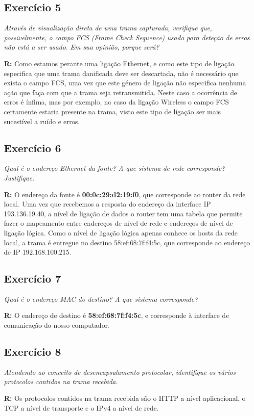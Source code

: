 \documentclass{llncs}
\begin{document}
\subsection{Exercício 5}
\emph{Através de visualização direta de uma trama capturada, verifique que, possivelmente,
o campo FCS (Frame Check Sequence) usado para deteção de erros não está a ser usado. Em 
sua opinião, porque será?}
\\ \par
\textbf{R:} Como estamos perante uma ligação Ethernet, e como este tipo de ligação
especifica que uma trama danificada deve ser descartada, não é necessário que exista
o campo FCS, uma vez que este género de ligação não especifica nenhuma ação que faça com
que a trama seja retransmitida. Neste caso a ocorrência de erros é ínfima, mas por 
exemplo, no caso da ligação Wireless o campo FCS certamente estaria presente na 
trama, visto este tipo de ligação ser mais sucestível a ruído e erros.


\subsection{Exercício 6}
\emph{Qual é o endereço Ethernet da fonte? A que sistema de rede corresponde? Justifique.}
\\ \par
\textbf{R:} O endereço da fonte é \textbf{00:0c:29:d2:19:f0}, que corresponde ao router
da rede local. Uma vez que recebemos a resposta do endereço da interface IP 193.136.19.40,
a nível de ligação de dados o router tem uma tabela que permite fazer o mapeamento entre
endereços de nível de rede e endereços de nível de ligação lógica. Como o nível de ligação
lógica apenas conhece os hosts da rede local, a trama é entregue no destino 
58:ef:68:7f:f4:5c, que corresponde ao endereço de IP 192.168.100.215.


\subsection{Exercício 7}
\emph{Qual é o endereço MAC do destino? A que sistema corresponde?}
\\ \par
\textbf{R:} O endereço de destino é \textbf{58:ef:68:7f:f4:5c}, e corresponde à interface
de comunicação do nosso computador.


\subsection{Exercício 8}
\emph{Atendendo ao conceito de desencapsulamento protocolar, identifique os vários 
protocolos contidos na trama recebida.}
\\ \par
\textbf{R:} Os protocolos contidos na trama recebida são o HTTP a nível aplicacional, o
TCP a nível de transporte e o IPv4 a nível de rede.
\end{document}
